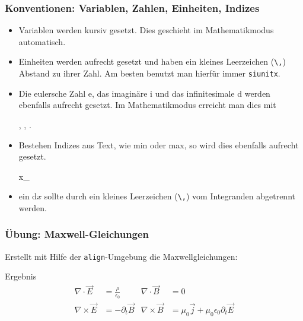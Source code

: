 \begin{frame}[fragile]
    \frametitle{Konventionen: Variablen, Zahlen, Einheiten, Indizes}
    \begin{itemize}
        \item Variablen werden kursiv gesetzt. Dies geschieht im Mathematikmodus automatisch.
        \item Einheiten werden aufrecht gesetzt und haben ein kleines Leerzeichen (\verb+\,+) Abstand zu ihrer Zahl. Am besten benutzt man hierfür immer \texttt{siunitx}.
        \item Die eulersche Zahl e, das imaginäre i und das infinitesimale d werden ebenfalls aufrecht gesetzt. Im Mathematikmodus erreicht man dies mit
            \begin{lstverbatim}
            , , .
            \end{lstverbatim}
        \item Bestehen Indizes aus Text, wie min oder max, so wird dies ebenfalls aufrecht gesetzt.
            \begin{lstverbatim}
            x_
            \end{lstverbatim}
        \item ein $\mathrm{d}x$ sollte durch ein kleines Leerzeichen (\verb+\,+) vom Integranden abgetrennt werden.
    \end{itemize}
\end{frame}
\begin{frame}
    \frametitle{Übung: Maxwell-Gleichungen}
    Erstellt mit Hilfe der \texttt{align}-Umgebung die Maxwellgleichungen:
    \begin{block}{Ergebnis}
        \begin{align}
            \nabla \cdot \vec{E} &= \frac{\rho} {\epsilon_0} &
            \nabla \cdot \vec{B} &= 0 \\
            \nabla \times \vec{E} &= - \partial_t \vec{B} &
            \nabla \times \vec{B} &= \mu_0 \vec{j} + \mu_0 \epsilon_0 \partial_t \vec{E}
            \label{align}
        \end{align}
    \end{block}
\end{frame}
